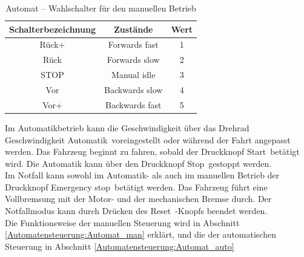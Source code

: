 \pagebreak[1]
\begin{table}[!ht]
	\centering
	\caption{Automat – Wahlschalter für den manuellen Betrieb}
	\label{Controllpanel:tab:Wahlschalter}
	\begin{tabular}{ccc}
		\hline
		\textbf{Schalterbezeichnung} & \textbf{Zustände} & \textbf{Wert} \\ \hline
		\multicolumn{1}{c|}{Rück+}   & Forwards fast     & 1             \\
		\multicolumn{1}{c|}{Rück}    & Forwards slow     & 2             \\
		\multicolumn{1}{c|}{STOP}    & Manual idle       & 3             \\
		\multicolumn{1}{c|}{Vor}     & Backwards slow    & 4             \\
		\multicolumn{1}{c|}{Vor+}    & Backwards fast    & 5             \\ \hline
	\end{tabular}
\end{table}
\pagebreak[3]
Im Automatikbetrieb kann die Geschwindigkeit über das Drehrad \frqq Geschwindigkeit Automatik\flqq\ voreingestellt oder während der Fahrt angepasst werden. Das Fahrzeug beginnt zu fahren, sobald der Druckknopf \frqq Start\flqq\ betätigt wird. Die Automatik kann über den Druckknopf \frqq Stop\flqq\ gestoppt werden.\\ Im Notfall kann sowohl im Automatik- als auch im manuellen Betrieb der Druckknopf \frqq Emergency stop\flqq\ betätigt werden. Das Fahrzeug führt eine Vollbremsung mit der Motor- und der mechanischen Bremse durch. Der Notfallmodus kann durch Drücken des \frqq Reset\flqq\ -Knopfs beendet werden.\\
Die Funktionsweise der manuellen Steuerung wird in Abschnitt \ref{Automatensteuerung:Automat_man} erklärt, und die der automatischen Steuerung in Abschnitt \ref{Automatensteuerung:Automat_auto}


